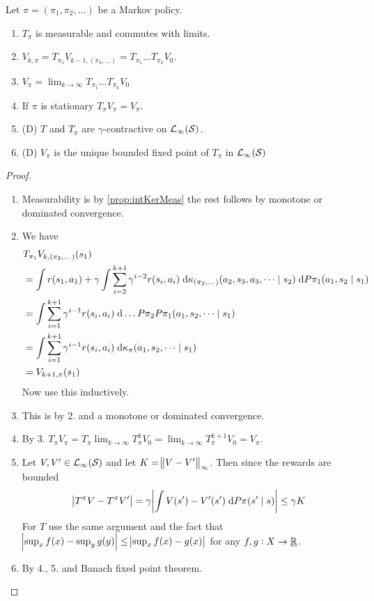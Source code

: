 \begin{prop}
  Let $\pi = (\pi_1, \pi_2, \dots)$ be a Markov policy.
  \begin{enumerate}
    \item $T_\pi$ is measurable and commutes with limits.
    \item $V_{k, \pi} = T_{\pi_1} V_{k-1, (\pi_2, \dots)}
      = T_{\pi_1} \dots T_{\pi_k} V_0$.
    \item $V_\pi = \lim_{k \to \infty} T_{\pi_1} \dots T_{\pi_k} V_0$
    \item If $\pi$ is stationary $T_\pi V_\pi = V_\pi$.
    \item (D) $T$ and $T_\pi$ are $\gamma$-contractive
      on $\mathcal{L}_\infty(\mathcal{S})$.
    \item (D) $V_\pi$ is the unique bounded fixed point of $T_\pi$
      in $\mathcal{L}_\infty(\mathcal{S})$
  \end{enumerate} 
  \label{prop:propTpiV}
\end{prop}
\begin{proof}
  \leavevmode
  \begin{enumerate}
    \item Measurability is by \cref{prop:intKerMeas} the rest follows by
      monotone or dominated convergence.
      \label{commLimits}
    \item We have
      \begin{align*}
	&T_{\pi_1} V_{k,(\pi_2, \dots)}(s_1)
	\\ &= \int r(s_1, a_1) + \gamma
	\int \sum_{i=2}^{k+1} \gamma^{i-2} r(s_i, a_i)
	\; \mathrm{d} \kappa_{(\pi_2, \dots)} (a_2, s_3, a_3, \dots \mid s_2)
	\; \mathrm{d} P \pi_1(a_1, s_2 \mid s_1)
	\\ &= \int \sum_{i=1}^{k+1} \gamma^{i-1} r(s_i, a_i)
	\; \mathrm{d} \dots P \pi_2 P \pi_1 (a_1, s_2, \dots \mid s_1)
	\\ &= \int \sum_{i=1}^{k+1} \gamma^{i-1} r(s_i, a_i)
	\; \mathrm{d} \kappa_\pi (a_1, s_2, \dots \mid s_1)
	\\ &= V_{k+1, \pi}(s_1)
      \end{align*}
      Now use this inductively.
    \item This is by 2. and a monotone or dominated convergence.
    \item By 3. $T_\pi V_\pi = T_\pi \lim_{k \to\infty} T_{\pi}^k V_0
      = \lim_{k \to\infty} T_\pi^{k+1} V_0 = V_\pi$.
    \item Let $V, V' \in \mathcal{L}_\infty(\mathcal{S})$
      and let $K = \norm{V - V'}_\infty$.
      Then since the rewards are bounded
      \[ \abs{T^\pi V - T^\pi V'}
	= \gamma \abs{\int V(s') - V'(s') \; \mathrm{d} P\pi(s' \mid s)}
      \leq \gamma K \]
      For $T$ use the same argument and the fact that
      $\abs{\sup_x f(x) - \sup_{y} g(y)} \leq
      \abs{\sup_x f(x) - g(x)}$ for any $f,g : X \to \underline{\mathbb{R}}$.
    \item By 4., 5. and Banach fixed point theorem.
  \end{enumerate}
\end{proof}

